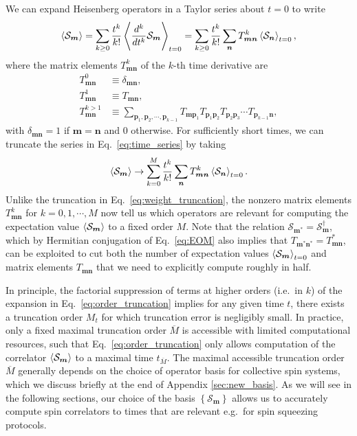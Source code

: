 \documentclass[pra,reprint,longbibliography]{revtex4-1}
\newcommand{\f}[2]{\dfrac{#1}{#2}} %
\renewcommand{\set}[1]{\left\{#1\right\}} %
\renewcommand{\v}{\bm} %
\newcommand{\bk}{\Braket} %
\renewcommand{\S}{\mathcal{S}}
\newcommand{\1}{\mathds{1}}
\begin{document}
We can expand Heisenberg operators in a Taylor series about $t=0$ to
write
\begin{align}
  \bk{\S_{\v m}}
  = \sum_{k\ge0} \f{t^k}{k!} \bk{\f{d^k}{dt^k} \S_{\v m}}_{t=0}
  = \sum_{k\ge0} \f{t^k}{k!}
  \sum_{\v n} T^k_{\v m\v n} \bk{\S_{\v n}}_{t=0},
  \label{eq:time_series}
\end{align}
where the matrix elements $T^k_{\v m\v n}$ of the $k$-th time
derivative are
\begin{align}
  T^0_{\v m\v n} &\equiv \delta_{\v m\v n}, \\
  T^1_{\v m\v n} &\equiv T_{\v m\v n}, \\
  T^{k>1}_{\v m\v n}
  &\equiv \sum_{\v p_1,\v p_2,\cdots,\v p_{k-1}}
  T_{\v m\v p_1} T_{\v p_1\v p_2} T_{\v p_2\v p_3}
  \cdots T_{\v p_{k-1}\v n},
\end{align}
with $\delta_{\v m\v n}=1$ if $\v m=\v n$ and 0 otherwise.  For
sufficiently short times, we can truncate the series in
Eq.~\eqref{eq:time_series} by taking
\begin{align}
  \bk{\S_{\v m}}
  \to \sum_{k=0}^M \f{t^k}{k!}
  \sum_{\v n} T^k_{\v m\v n} \bk{\S_{\v n}}_{t=0}.
  \label{eq:order_truncation}
\end{align}
Unlike the truncation in Eq.~\eqref{eq:weight_truncation}, the nonzero
matrix elements $T^k_{\v m\v n}$ for $k=0,1,\cdots,M$ now tell us
which operators are relevant for computing the expectation value
$\bk{\S_{\v m}}$ to a fixed order $M$.  Note that the relation
$\S_{\v m^*}=\S_{\v m}^\dag$, which by Hermitian conjugation of
Eq.~\eqref{eq:EOM} also implies that
$T_{\v m^*\v n^*}=T_{\v m\v n}^*$, can be exploited to cut both the
number of expectation values $\bk{\S_{\v m}}_{t=0}$ and matrix
elements $T_{\v m\v n}$ that we need to explicitly compute roughly in
half.

In principle, the factorial suppression of terms at higher orders
(i.e.~in $k$) of the expansion in Eq.~\eqref{eq:order_truncation}
implies for any given time $t$, there exists a truncation order $M_t$
for which truncation error is negligibly small.  In practice, only a
fixed maximal truncation order $\overline M$ is accessible with
limited computational resources, such that
Eq.~\eqref{eq:order_truncation} only allows computation of the
correlator $\bk{\S_{\v m}}$ to a maximal time $t_{\overline M}$.  The
maximal accessible truncation order $\overline M$ generally depends on
the choice of operator basis for collective spin systems, which we
discuss briefly at the end of Appendix \ref{sec:new_basis}.  As we
will see in the following sections, our choice of the basis
$\set{\S_{\v m}}$ allows us to accurately compute spin correlators to
times that are relevant e.g.~for spin squeezing protocols.
\end{document}
